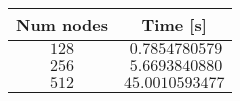 \begin{center}
\begin{tabular}{cc}
\toprule
\multicolumn{1}{c}{Num nodes}&\multicolumn{1}{c}{Time [s]}\tabularnewline
\midrule
$128$&$~0.7854780579$\tabularnewline
$256$&$~5.6693840880$\tabularnewline
$512$&$45.0010593477$\tabularnewline
\bottomrule
\end{tabular}\end{center}
